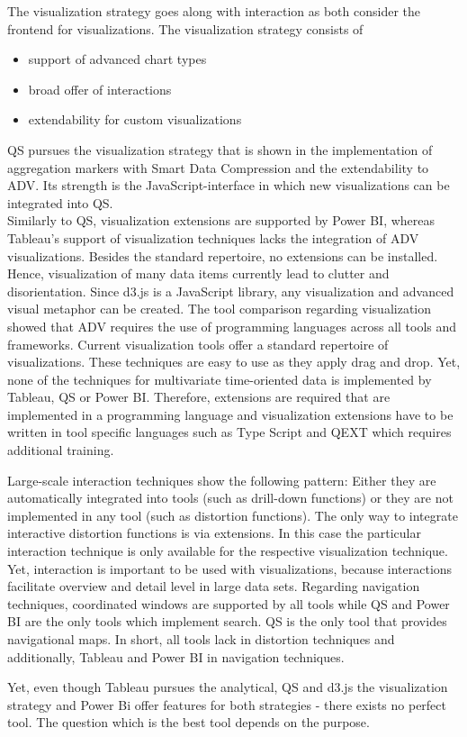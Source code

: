 The visualization strategy goes along with interaction as both consider the frontend for visualizations. The visualization strategy consists of \begin{itemize}
    \item support of advanced chart types
    \item broad offer of interactions
    \item extendability for custom visualizations
\end{itemize} 
\gls{QS}   pursues the visualization strategy that is shown in the implementation of aggregation markers with Smart Data Compression and the extendability to \gls{ADV}. Its strength is the JavaScript-interface in which new visualizations can be integrated into QS. \\
Similarly to \gls{QS},   visualization extensions are supported by Power BI, whereas Tableau's support of visualization techniques lacks the integration of ADV visualizations. Besides the standard repertoire, no extensions can be installed. Hence, visualization of many data items currently lead to clutter and disorientation. Since d3.js is a JavaScript library, any visualization and advanced visual metaphor can be created.
The tool comparison regarding visualization showed that ADV requires the use of programming languages across all tools and frameworks. Current visualization tools offer a standard repertoire of visualizations. These techniques are easy to use as they apply drag and drop. Yet, none of the techniques for multivariate time-oriented data is implemented by Tableau, \gls{QS}   or Power BI. Therefore, extensions are required that are implemented in a programming language and visualization extensions have to be written in tool specific languages such as Type Script and QEXT which requires additional training.
\par
Large-scale interaction techniques show the following pattern: Either they are automatically integrated into tools (such as drill-down functions) or they are not implemented in any tool (such as distortion functions). The only way to integrate interactive distortion functions is via extensions. In this case the particular interaction technique is only available for the respective visualization technique. Yet, interaction is important to be used with visualizations, because interactions facilitate overview and detail level in large data sets. 
Regarding navigation techniques, coordinated windows are supported by all tools while \gls{QS}   and Power BI are the only tools which implement search. \gls{QS} is the only tool that provides navigational maps.
In short, all tools lack in distortion techniques and additionally, Tableau and Power BI in navigation techniques. 
\par
Yet, even though Tableau pursues the analytical, \gls{QS} and d3.js the visualization strategy and Power Bi offer features for both strategies - there exists no perfect tool. The question which is the best tool depends on the purpose. 

